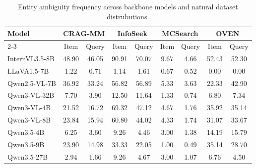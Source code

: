 \begin{table}[htbp]
    \centering
    \setlength{\tabcolsep}{3pt}
    \caption{Entity ambiguity frequency across backbone models and natural dataset distrubutions.}
    \begin{tabular}{lcccccccc}
    \hline
    \textbf{Model} & \multicolumn{2}{c}{\textbf{CRAG-MM}} & \multicolumn{2}{c}{\textbf{InfoSeek}} & \multicolumn{2}{c}{\textbf{MCSearch}} & \multicolumn{2}{c}{\textbf{OVEN}} \\
    \cline{2-3} \cline{4-5} \cline{6-7} \cline{8-9}
    & Item & Query & Item & Query & Item & Query & Item & Query \\
    \hline
    InternVL3.5-8B & 48.90 & 46.05 & 90.91 & 70.07 & 9.67 & 4.66 & 52.43 & 52.30 \\
    LLaVA1.5-7B & 1.22 & 0.71 & 1.14 & 1.61 & 0.67 & 0.52 & 0.00 & 0.00 \\
    Qwen2.5-VL-7B & 36.92 & 33.24 & 56.82 & 56.89 & 5.33 & 3.63 & 22.33 & 42.90 \\
    Qwen3-VL-32B & 7.70 & 3.90 & 12.50 & 11.64 & 1.33 & 0.74 & 6.80 & 7.34 \\
    Qwen3-VL-4B & 21.52 & 16.72 & 69.32 & 47.12 & 4.67 & 1.76 & 35.92 & 35.14 \\
    Qwen3-VL-8B & 23.84 & 15.94 & 60.80 & 44.02 & 4.33 & 1.74 & 31.07 & 33.67 \\
    Qwen3.5-4B  & 6.25 & 3.60 & 9.26 & 4.46 & 3.00 & 1.38 & 14.19 & 15.79 \\
    Qwen3.5-9B  & 23.90 & 14.98 & 33.33 & 22.05 & 1.00 & 0.49 & 35.14 & 28.70 \\
    Qwen3.5-27B  & 2.94 & 1.66 & 9.26 & 4.67 & 3.00 & 1.07 & 6.76 & 4.50 \\
    \hline
    \end{tabular}
    \label{tab:ambiguity_frequency_source}
\end{table}
